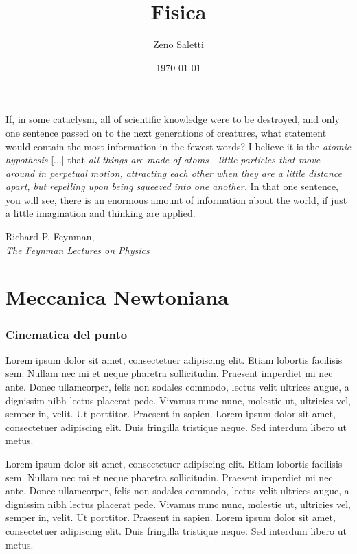\documentclass{book}
\title{Fisica}
\author{Zeno Saletti}
\date{\today}
\begin{document}
\begin{titlepage}
\maketitle
\epigraph{If, in some cataclysm, all of scientific knowledge were
to be destroyed, and only one sentence passed on to the next generations
of creatures, what statement would contain the most information in the
fewest words? I believe it is the \textit{atomic hypothesis} [...]
that \textit{all things are made of atoms—little particles that move
around in perpetual motion, attracting each other when they are a little
distance apart, but repelling upon being squeezed into one another.}
In that one sentence, you will see, there is an enormous amount of
information about the world, if just a little imagination and
thinking are applied.}{Richard P. Feynman,\\\textit{The Feynman Lectures on Physics}}
\end{titlepage}


\dominitoc
\tableofcontents




\part{Meccanica Newtoniana}



\section{Cinematica del punto}\marginpar{\minitoc}
Lorem ipsum dolor sit amet, consectetuer adipiscing elit. Etiam lobortis facilisis
sem. Nullam nec mi et neque pharetra sollicitudin. Praesent imperdiet mi nec
ante. Donec ullamcorper, felis non sodales commodo, lectus velit ultrices augue,
a dignissim nibh lectus placerat pede. Vivamus nunc nunc, molestie ut, ultricies
vel, semper in, velit. Ut porttitor. Praesent in sapien. Lorem ipsum dolor sit
amet, consectetuer adipiscing elit. Duis fringilla tristique neque. Sed interdum
libero ut metus.

Lorem ipsum dolor sit amet, consectetuer adipiscing elit. Etiam lobortis facilisis
sem. Nullam nec mi et neque pharetra sollicitudin. Praesent imperdiet mi nec
ante. Donec ullamcorper, felis non sodales commodo, lectus velit ultrices augue,
a dignissim nibh lectus placerat pede. Vivamus nunc nunc, molestie ut, ultricies
vel, semper in, velit. Ut porttitor. Praesent in sapien. Lorem ipsum dolor sit
amet, consectetuer adipiscing elit. Duis fringilla tristique neque. Sed interdum
libero ut metus.
\end{document}
